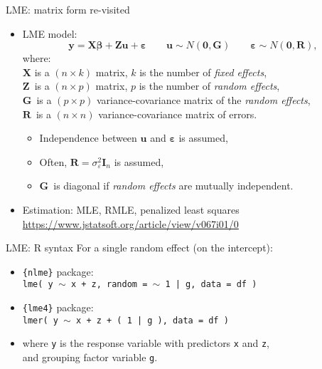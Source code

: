 \documentclass{beamer}
\begin{document}
\begin{frame}{LME: matrix form re-visited}
\begin{itemize}
\item LME model:
$$\bm{y} = \bm{X \beta} + \bm{Z u} + \bm{\varepsilon} 
\qquad \bm{u} \sim N(\bm{0}, \bm{G})
\qquad \bm{\varepsilon} \sim N(\bm{0}, \bm{R}),$$
where:\\
$\bm{X}$ is a $(n \! \times \! k)$ matrix, $k$ is the number of \textit{fixed effects},\\
$\bm{Z}\,$ is a $(n \! \times \! p)$ matrix, $p$ is the number of \textit{random effects},\\
$\bm{G}\,$ is a $(p \! \times \! p)$ variance-covariance matrix of the \textit{random effects},\\
$\bm{R}\,$ is a $(n \! \times \! n)$ variance-covariance matrix of errors.\\
\medskip
\begin{itemize}
    \item Independence between $\bm{u}$ and $\bm{\varepsilon}$ is assumed,\\
    \item  Often, $\bm{R}=\sigma^2_{\varepsilon} \bm{I}_n$ is assumed,\\
    \item $\bm{G}\,$ is diagonal if \textit{random effects} are mutually independent.
\end{itemize}
\medskip
\item Estimation: MLE, RMLE, penalized least squares
\small
\\ \url{https://www.jstatsoft.org/article/view/v067i01/0}\\
\end{itemize}
\end{frame}
\begin{frame}{LME: R syntax}
\small 
For a single random effect (on the intercept): \\
\bigskip
\begin{itemize}
    \item \texttt{\{nlme\}} package: \\ \medskip
    \texttt{lme( y $\sim$ x + z, random = $\sim$ 1 | g, data = df )}
    \bigskip
    \item \texttt{\{lme4\}} package: \\ \medskip
    \texttt{lmer( y $\sim$ x + z + ( 1 | g ), data = df )}
    \bigskip
    \item where \texttt{y} is the response variable with predictors \texttt{x} and \texttt{z}, \\and grouping factor variable \texttt{g}.
\end{itemize}
\end{frame}
\end{document}
